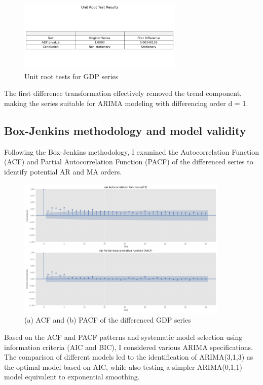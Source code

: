\documentclass[11pt,a4paper]{article}
\begin{document}
\begin{figure}[H]
    \centering
    \includegraphics[width=0.7\textwidth]{plots/arima/gdp/unit_root_test_table.png}
    \caption{Unit root tests for GDP series}
    \label{tab:unit_root}
\end{figure}

The first difference transformation effectively removed the trend component, making the series suitable for ARIMA modeling with differencing order d = 1.

\subsection{Box-Jenkins methodology and model validity}

Following the Box-Jenkins methodology, I examined the Autocorrelation Function (ACF) and Partial Autocorrelation Function (PACF) of the differenced series to identify potential AR and MA orders.

\begin{figure}[H]
    \centering
    \includegraphics[width=0.9\textwidth]{plots/arima/gdp/figure2_acf_pacf.png}
    \caption{(a) ACF and (b) PACF of the differenced GDP series}
    \label{fig:acf_pacf}
\end{figure}

Based on the ACF and PACF patterns and systematic model selection using information criteria (AIC and BIC), I considered various ARIMA specifications. The comparison of different models led to the identification of ARIMA(3,1,3) as the optimal model based on AIC, while also testing a simpler ARIMA(0,1,1) model equivalent to exponential smoothing.
\end{document}
